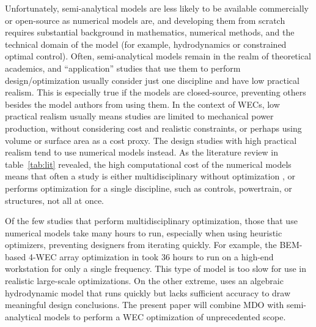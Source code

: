 Unfortunately, semi-analytical models are less likely to be available commercially or open-source as numerical models are, and developing them from scratch requires substantial background in mathematics, numerical methods, and the technical domain of the model (for example, hydrodynamics or constrained optimal control).
Often, semi-analytical models remain in the realm of theoretical academics, and ``application'' studies that use them to perform design/optimization usually consider just one discipline and have low practical realism.
This is especially true if the models are closed-source, preventing others besides the model authors from using them.
In the context of WECs, low practical realism usually means studies are limited to mechanical power production, without considering cost and realistic constraints, or perhaps using volume or surface area as a cost proxy.
The design studies with high practical realism tend to use numerical models instead.
As the literature review in table~\ref{tab:lit} revealed, the high computational cost of the numerical models means that often a study is either multidisciplinary without optimization \cite{RM3,mi_multi-scale_2025}, or performs optimization for a single discipline, such as controls, powertrain, or structures, not all at once. 

Of the few studies that perform multidisciplinary optimization, those that use numerical models take many hours to run, especially when using heuristic optimizers, preventing designers from iterating quickly.
For example, the BEM-based 4-WEC array optimization in \cite{khanal_multi-objective_2024} took 36 hours to run on a high-end workstation for only a single frequency.
This type of model is too slow for use in realistic large-scale optimizations.
On the other extreme, \cite{mccabe_multidisciplinary_2022} uses an algebraic hydrodynamic model that runs quickly but lacks sufficient accuracy to draw meaningful design conclusions.
The present paper will combine MDO with semi-analytical models to perform a WEC optimization of unprecedented scope.

